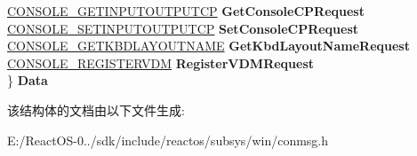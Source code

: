 \begin{DoxyCompactItemize}
\begin{tabbing}
\>\hyperlink{struct___c_o_n_s_o_l_e___g_e_t_i_n_p_u_t_o_u_t_p_u_t_c_p}{CONSOLE\_GETINPUTOUTPUTCP} {\bfseries GetConsoleCPRequest}\\
\>\hyperlink{struct___c_o_n_s_o_l_e___s_e_t_i_n_p_u_t_o_u_t_p_u_t_c_p}{CONSOLE\_SETINPUTOUTPUTCP} {\bfseries SetConsoleCPRequest}\\
\>\hyperlink{struct___c_o_n_s_o_l_e___g_e_t_k_b_d_l_a_y_o_u_t_n_a_m_e}{CONSOLE\_GETKBDLAYOUTNAME} {\bfseries GetKbdLayoutNameRequest}\\
\>\hyperlink{struct___c_o_n_s_o_l_e___r_e_g_i_s_t_e_r_v_d_m}{CONSOLE\_REGISTERVDM} {\bfseries RegisterVDMRequest}\\
\} {\bfseries Data}\\

\end{tabbing}\end{DoxyCompactItemize}


该结构体的文档由以下文件生成\+:\begin{DoxyCompactItemize}
\item 
E\+:/\+React\+O\+S-\/0../sdk/include/reactos/subsys/win/conmsg.\+h\end{DoxyCompactItemize}
